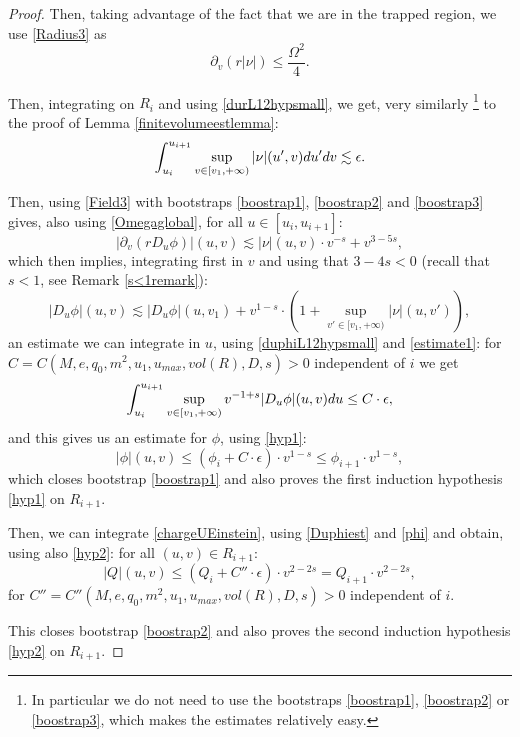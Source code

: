 \documentclass[10pt,a4paper]{article}
\theoremstyle{plain}
\theoremstyle{remark}
\theoremstyle{definition}
\theoremstyle{plain}
\theoremstyle{remark}
\theoremstyle{definition}
\newcommand{\uu}{u_{max}}
\numberwithin{equation}{section}
\begin{document}
\begin{proof}
	
	Then, taking advantage of the fact that we are in the trapped region, we use \eqref{Radius3} as $$\partial_v(r|\nu|) \leq \frac{\Omega^2}{4}.$$
	
	Then, integrating on $R_i$ and using \eqref{durL12hypsmall}, we get, very similarly \footnote{In particular we do not need to use the bootstraps \eqref{boostrap1}, \eqref{boostrap2} or \eqref{boostrap3}, which makes the estimates relatively easy.} to the proof of Lemma \ref{finitevolumeestlemma}: 	\begin{equation} \label{estimate1}
	\int_{u_i}^{u_{i+1}}\color{black} \sup_{v \in [v_1,+\infty)} |\nu|(u',v)du' dv \lesssim \epsilon.
	\end{equation} 	
	
	Then, using \eqref{Field3}\color{black} with bootstraps \eqref{boostrap1}, \eqref{boostrap2} and \eqref{boostrap3} gives, also using \eqref{Omegaglobal}, for all $u\in[u_i,u_{i+1}]$: $$ |\partial_v(rD_u \phi)|(u,v) \lesssim  |\nu|(u,v) \cdot v^{-s} +  v^{3-5s},$$ which then implies, integrating first in $v$ and using that $3-4s<0$ (recall that $s<1$, see Remark \ref{s<1remark}): $$ |D_u \phi|(u,v) \lesssim |D_u \phi|(u,v_1)  + v^{1-s} \cdot (	1+\sup_{ v' \in [v_1,+\infty)}|\nu|(u,v')),$$
	an estimate we can integrate in $u$, using \eqref{duphiL12hypsmall} and \eqref{estimate1}: for $C=C(M,e,q_0,m^2,u_1,\uu,vol(R),D,s)>0$ independent of $i$ we get \begin{equation} \label{Duphiest}
	\int_{u_i}^{u_{i+1}}	\sup_{ v \in [v_1,+\infty)} v^{-1+s} \color{black}|D_u \phi|(u,v) du \leq C \cdot \epsilon,
	\end{equation} and this gives us an estimate for $\phi$, using \eqref{hyp1}: \begin{equation}  \label{phi}
	|\phi|(u,v) \leq (\phi_i + C\cdot \epsilon) \cdot v^{1-s} \leq \phi_{i+1} \cdot v^{1-s},
	\end{equation} which closes bootstrap \eqref{boostrap1} and also proves the first induction hypothesis \eqref{hyp1} on $R_{i+1}$.
	
	Then, we can integrate \eqref{chargeUEinstein}, using \eqref{Duphiest} and \eqref{phi} and obtain, using also \eqref{hyp2}: for all $(u,v) \in R_{i+1}$: \begin{equation} \label{Q}
	|Q|(u,v) \leq (Q_i+C''\cdot \epsilon) \cdot v^{2-2s} = Q_{i+1} \cdot v^{2-2s},
	\end{equation} for $C''=C''(M,e,q_0,m^2,u_1,\uu,vol(R),D,s)>0$ independent of $i$. 
	
	This closes bootstrap \eqref{boostrap2} and also proves the second induction hypothesis \eqref{hyp2} on $R_{i+1}$.
	

\end{proof}
\end{document}
